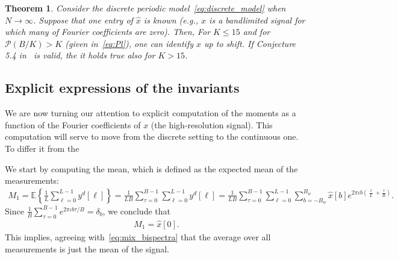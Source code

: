 \documentclass[english,12pt]{article}
\newcommand{\I}{\iota}
\newcommand{\tB}{B_w}
\newcommand{\hx}{\hat{x}}
\newcommand{\E}{\mathbb{E}}
\newtheorem{thm}{Theorem}
\numberwithin{equation}{section}
\numberwithin{thm}{section} %
\begin{document}
\begin{thm}
Consider the  discrete periodic model~\eqref{eq:discrete_model} when $N\to\infty$. Suppose that one entry of $\hx$ is known (e.g., $x$ is a bandlimited signal for which many of Fourier coefficients are zero). 
Then, For $K\leq 15$ and for $\mathcal{P}(B/K)>K$ (given in~\eqref{eq:Pl}), one can identify $x$ up to shift. 
If Conjecture 5.4 in~\cite{bandeira2017estimation} is valid, the it holds true also for $K>15$.
\end{thm}

\subsection{Explicit expressions of the invariants}

We are now turning our attention to explicit computation of the moments as a function of the Fourier coefficients of $x$ (the high-resolution signal). This computation will serve to move from the discrete setting to the continuous one. To differ it from the  

We start by computing the mean, which is defined as the expected mean of the measurements: 
\begin{equation}
\begin{split}
M_1 = \E\left\{ \frac{1}{L} \sum_{\ell=0}^{L-1} y^d[\ell]\right\} =  \frac{1}{LB}\sum_{\tau=0}^{B-1}\sum_{\ell=0}^{L-1} y^d[\ell] =  \frac{1}{LB}\sum_{\tau=0}^{B-1}\sum_{\ell=0}^{L-1}
\sum_{b=-\tB}^{\tB}\hat{x}[b]e^{2\pi\I b \left(\frac{\ell}{L} + \frac{\tau}{B}\right) }.
\end{split}
\end{equation}
Since $\frac{1}{B}\sum_{\tau=0}^{B-1}e^{2\pi\I b \tau/B}=\delta_b$, we conclude that 
\begin{equation} \label{eq:mean}
\begin{split}
M_1 = \hx[0].
\end{split}
\end{equation}
This  implies, agreeing with~\eqref{eq:mix_bispectra} that the average over all measurements is just the mean of the signal.  
\end{document}
